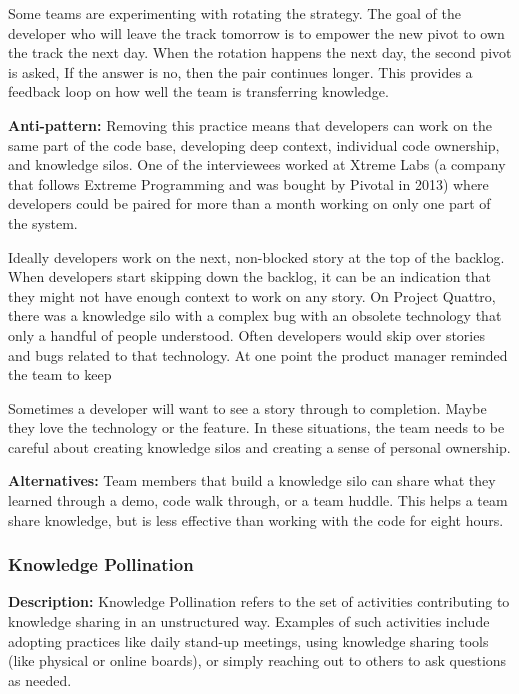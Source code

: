 \begin{table}[]
Some teams are experimenting with rotating the  strategy. The goal of the developer who will leave the track tomorrow is to empower the new pivot to own the track the next day. When the rotation happens the next day, the second pivot is asked,  If the answer is no, then the pair continues longer. This provides a feedback loop on how well the team is transferring knowledge.  

\textbf{Anti-pattern:} Removing this practice means that developers can work on the same part of the code base, developing deep context, individual code ownership, and knowledge silos. One of the interviewees worked at Xtreme Labs (a company that follows Extreme Programming and was bought by Pivotal in 2013) where developers could be paired for more than a month working on only one part of the system. 

Ideally developers work on the next, non-blocked story at the top of the backlog. When developers start skipping down the backlog, it can be an indication that they might not have enough context to work on any story. On Project Quattro, there was a knowledge silo with a complex bug with an obsolete technology that only a handful of people understood. Often developers would skip over stories and bugs related to that technology. At one point the product manager reminded the team to keep  

Sometimes a developer will want to see a story through to completion. Maybe they love the technology or the feature. In these situations, the team needs to be careful about creating knowledge silos and creating a sense of personal ownership.

\textbf{Alternatives:} Team members that build a knowledge silo can share what they learned through a demo, code walk through, or a team huddle. This helps a team share knowledge, but is less effective than working with the code for eight hours. 

\subsubsection{Knowledge Pollination}
\textbf{Description:} Knowledge Pollination refers to the set of activities contributing to knowledge sharing in an unstructured way. Examples of such activities include adopting practices like daily stand-up meetings, using knowledge sharing tools (like physical or online boards), or simply reaching out to others to ask questions as needed.


\end{table}
